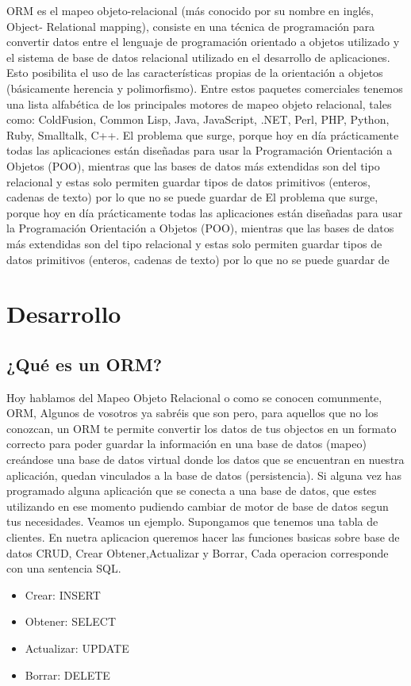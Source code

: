 \documentclass[twoside,twocolumn]{article}
\begin{document}
ORM es el mapeo objeto-relacional (más conocido por su nombre en inglés, Object- Relational mapping), consiste
en una técnica de programación para convertir datos entre el lenguaje de programación
orientado a objetos utilizado y el sistema de base de datos relacional utilizado en el
desarrollo de aplicaciones. Esto posibilita el uso de las características propias de la
orientación a objetos (básicamente herencia y polimorfismo). Entre estos paquetes comerciales tenemos
una lista alfabética de los principales motores de mapeo objeto relacional, tales como:
ColdFusion, Common Lisp, Java, JavaScript, .NET, Perl, PHP, Python, Ruby, Smalltalk, C++. El problema que surge, porque hoy en
día prácticamente todas las aplicaciones están diseñadas para usar la Programación
Orientación a Objetos (POO), mientras que las bases de datos más extendidas son del
tipo relacional y estas solo permiten guardar tipos de datos primitivos (enteros, cadenas
de texto) por lo que no se puede guardar de El problema que surge, porque hoy en
día prácticamente todas las aplicaciones están diseñadas para usar la Programación
Orientación a Objetos (POO), mientras que las bases de datos más extendidas son del
tipo relacional y estas solo permiten guardar tipos de datos primitivos (enteros, cadenas de texto) por lo que no se puede guardar de 


\section{Desarrollo}

\subsection{¿Qué es un ORM?}

Hoy hablamos del Mapeo Objeto Relacional o como se conocen comunmente, ORM, Algunos de vosotros ya 
sabréis que son pero, para aquellos que
no los conozcan, un ORM te permite
convertir los datos de tus objectos en un
formato correcto para poder guardar la
información en una base de datos (mapeo)
creándose una base de datos virtual
donde los datos que se encuentran en
nuestra aplicación, quedan vinculados a
la base de datos (persistencia). Si alguna vez has programado alguna aplicación que se conecta a una base de
datos, que estes utilizando en ese momento pudiendo cambiar de motor de base de datos segun tus necesidades.
Veamos un ejemplo. Supongamos que tenemos una tabla de clientes. En nuetra aplicacion queremos hacer las funciones basicas
sobre base de datos CRUD, Crear Obtener,Actualizar y Borrar, Cada operacion corresponde con una sentencia SQL. 
\begin{itemize}
	\item Crear: INSERT
	\item Obtener: SELECT
	\item Actualizar: UPDATE
	\item Borrar: DELETE
\end{itemize}
\end{document}
